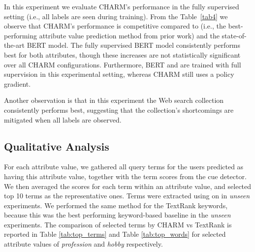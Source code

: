 In this experiment we evaluate CHARM's performance in the fully supervised setting (i.e., all labels are seen during training).
From the Table~\ref{tab4} we observe that CHARM's performance is competitive compared to  (i.e., the best-performing attribute value prediction method from prior work) and the state-of-the-art BERT model.
The fully supervised BERT model consistently performs best for both attributes, though these increases are not statistically significant over all CHARM configurations. Furthermore, BERT and  are trained with full supervision in this experimental setting, whereas CHARM still uses a policy gradient.

Another observation is that in this experiment the Web search collection consistently performs best, suggesting that the collection's shortcomings are mitigated when all labels are observed.


\balance
\subsection{Qualitative Analysis}

For each attribute value, we gathered all query terms for the users predicted as having this attribute value, together with the term scores from the cue detector.
We then averaged the scores for each term within an attribute value, and selected top 10 terms as the representative ones. 
Terms were extracted using  on  in \emph{unseen} experiments.
We performed the same method for the TextRank keywords, because this was the best performing keyword-based baseline in the \emph{unseen} experiments.
The comparison of selected terms by CHARM vs TextRank is reported in Table \ref{tab:top_terms} and Table \ref{tab:top_words} for selected attribute values of \emph{profession} and \emph{hobby} respectively.


